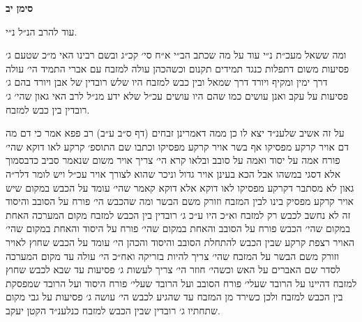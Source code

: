 \documentclass[12pt, openany]{book}
\newcommand{\chapname}{}
\newcommand{\newchap}[1]{
	\addcontentsline{toc}{chapter}{#1}
	\renewcommand{\chapname}{#1}
		\begin{center}
			\textbf{%
\fontsize{16pt}{16pt}\selectfont
				#1}
		\end{center}
}
\begin{document}
\newchap{סימן יב}
\begin{multicols}{2}
עוד להרב הנ״ל נ״י.\\\vspace{0pt}

ומה ששאל מעכ״ת נ״י עוד על מה שכתב הב״י א״ח סי׳ קכ״ג ובשם רבינו האי מ״כ שטעם ג׳ פסיעות משום דתפלות כנגד תמידים תקנום וכשהכהן עולה למזבח עם אברי התמיד הי׳ עולה דרך ימין ומקיף ויורד דרך שמאל ובין כבש למזבח היו שלש רובדין של אבן ויורד בהם ג׳ פסיעות על עקב ואנן עושים כמו שהם היו עושים עכ״ל שלא ידע מנ״ל לרב האי גאון שהי׳ ג׳ רובדין בין כבש למזבח.\\\vspace{0pt}

על זה אשיב שלענ״ד יצא לו כן ממה דאמרינן זבחים (דף ס״ב ע״ב) רב פפא אמר כי דם מה דם אויר קרקע מפסיקו אף בשר אויר קרקע מפסיקו וכתבו שם התוספ׳ קרקע לאו דוקא שהי׳ פורח אמה על יסוד ואמה על סובב ובלאו קרא הי׳ צריך אויר משום שנאמר סביב כדבסמוך אלא דסגי במשהו אבל הכא בעינן אויר גדול וניכר שהוא לצורך אויר עכ״ל ויש לומר דלר״ה גאון לא מסתבר דקרקע מפסיקו לאו דוקא אלא דוקא קאמר שהי׳ עומד על הכבש במקום שיש אויר קרקע מפסיק בינו לבין המזבח וזורק משם הבשר ומה שהכבש הי׳ פורח על הסובב והיסוד זה לא נחשב לכבש רק למזבח וא״כ היו ע״כ ג׳ רובדין בין הכבש למזבח מקום המערכה האחת במקום שהי׳ הכבש פורח על הסובב והאחת במקום שהי׳ פורח על היסוד והאחת במקום שהי׳ האויר רצפת קרקע שבין הכבש להתחלת הסובב והיסוד והכהן הי׳ עומד על הכבש שחוץ לאויר וזורק משם הבשר על המזבח שהי׳ צריך להיות בזריקה ואח״כ הי׳ עולה עד מקום המערכה לסדר שם האברים על האש וכשהי׳ חוזר הי׳ צריך לעשות ג׳ פסיעות עד שבא לכבש שחוץ למזבח דהיינו על הרובד שעלי׳ פורח הסובב ועל הרובד שעלי׳ פורח היסוד ועל הרובד שמפסקת בין הכבש למזבח ולכן כשירד מן המזבח עד שהגיע לכבש הי׳ עושה ג׳ פסיעות על גבי מקום שתחתיו ג׳ רובדין שבין הכבש למזבח כנלענ״ד הקטן יעקב.\\\vspace{0pt}

\end{multicols}\newpage
\end{document}
